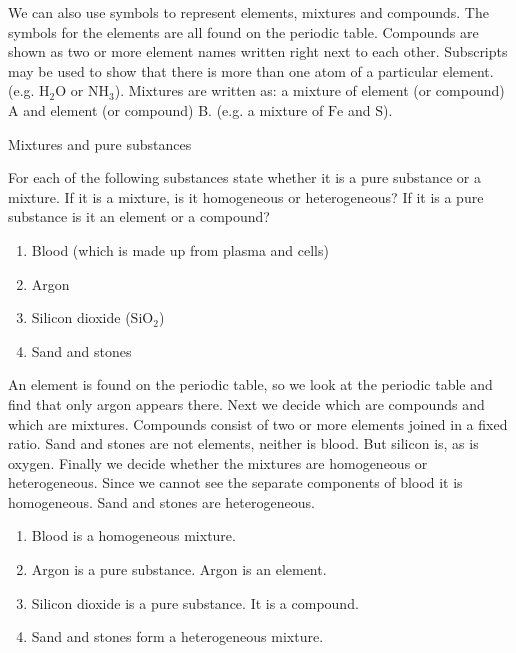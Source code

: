\label{m38708*id0124}We can also use symbols to represent elements, mixtures and compounds. The symbols for the elements are all found on the periodic table. Compounds are shown as two or more element names written right next to each other. Subscripts may be used to show that there is more than one atom of a particular element. (e.g. $\text{H}_{2}\text{O}$ or $\text{NH}_{3}$). Mixtures are written as: a mixture of element (or compound) A and element (or compound) B. (e.g. a mixture of $\text{Fe}$ and $\text{S}$).\par 
\label{m38708*eip-524}
      \begin{wex}
{Mixtures and pure substances}
{For each of the following substances state whether it is a pure substance or a mixture. If it is a mixture, is it homogeneous or heterogeneous? If it is a pure substance is it an element or a compound? 
\begin{enumerate}[noitemsep, label=\textbf{\alph*}. ] 
\item Blood (which is made up from plasma and cells)
\item Argon
\item Silicon dioxide (${\text{SiO}}_{2}$)
\item Sand and stones
\end{enumerate}
  }
{
An element is found on the periodic table, so we look at the periodic table and find that only argon appears there. Next we decide which are compounds and which are mixtures. Compounds consist of two or more elements joined in a fixed ratio. Sand and stones are not elements, neither is blood. But silicon is, as is oxygen. Finally we decide whether the mixtures are homogeneous or heterogeneous. Since we cannot see the separate components of blood it is homogeneous. Sand and stones are heterogeneous.
\begin{enumerate}
[noitemsep, label=\textbf{\alph*}. ]
\item Blood is a homogeneous mixture.
\item Argon is a pure substance. Argon is an element.
\item Silicon dioxide is a pure substance. It is a compound.
\item Sand and stones form a heterogeneous mixture.
\end{enumerate}}
    \end{wex}

